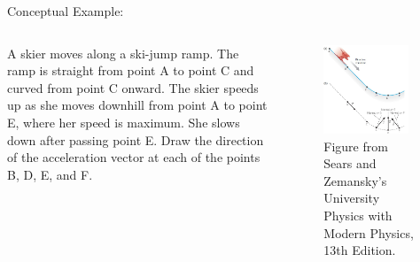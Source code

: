 \documentclass[]{beamer}
\begin{document}



\begin{frame}
    Conceptual Example:
    \vspace{3mm}


      \begin{columns}[c]
          \column{2in}  %
         
  
          A skier moves along a ski-jump ramp. The ramp is
          straight from point A to point C and curved from point C onward.
          The skier speeds up as she moves downhill from point A to point E,
          where her speed is maximum. She slows down after passing point
          E. Draw the direction of the acceleration vector at each of the
          points B, D, E, and F.
      
  
  
          \column{2.5in}
          
          \begin{figure}[h!]  
         \includegraphics[width=0.9\textwidth]{images/14.jpg}
          \caption{ {\tiny Figure from Sears and Zemansky's University Physics 
          with Modern Physics, 13th Edition.} }
       \end{figure}
       
       
       
          \end{columns}

          


\end{frame}
\end{document}
